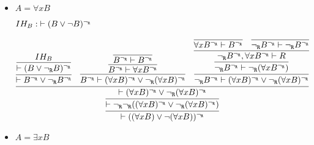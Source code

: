 \begin{enumerate}[(i)]
\begin{itemize}
        \item $A=\forall x B$
        
            $IH_B : \; \vdash (B \vee \neg B)^{\neg_{\texttt{R}}}$
           
            $$
                \infer{
                    \vdash ((\forall x B) \vee \neg (\forall x B))^\ngr
                }{
                    \infer{
                        \vdash \ngr\ngr((\forall x B)^\ngr \vee \ngr (\forall x B)^\ngr)
                    }{
                        \infer{
                            \vdash (\forall x B)^\ngr \vee \ngr (\forall x B)^\ngr
                        }{
                            \infer {
                                \vdash B^\ngr \vee \ngr B^\ngr
                            }{
                                \infer {
                                    \vdash (B \vee \ngr B)^\ngr
                                }{
                                    IH_B
                                }
                            }
                            &
                            \infer {
                                B^\ngr \vdash (\forall x B)^\ngr \vee \ngr (\forall x B)^\ngr
                            }{
                                \infer {
                                    B^\ngr \vdash \forall x B^\ngr
                                }{
                                    \infer {
                                        B^\ngr \vdash B^\ngr
                                    }{
                                    }
                                }
                            }
                            &
                            \infer {
                                \ngr B^\ngr \vdash (\forall x B)^\ngr \vee \ngr (\forall x B)^\ngr
                            }{
                                \infer {
                                    \ngr B^\ngr \vdash \ngr(\forall x B^\ngr)
                                 }{
                                     \infer {
                                        \ngr B^\ngr, \forall x B^\ngr \vdash R
                                    }{
                                        \infer {
                                            \forall x B^\ngr \vdash B^\ngr
                                        }{
                                        }
                                        &
                                        \infer {
                                           \ngr B^\ngr \vdash \ngr B^\ngr
                                        }{
                                        }
                                    }
                                }
                            }
                        }
                    }
                }
            $$
        \item $A=\exists x B$
        

\end{itemize}
\end{enumerate}
